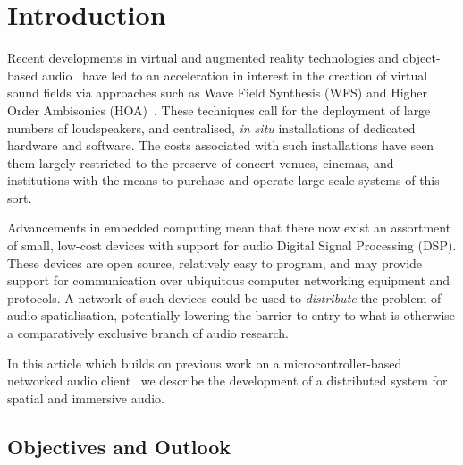 \section{Introduction}\label{sec:introduction}

Recent developments in virtual and augmented reality technologies and
object-based audio~\citep{geier_object-based_2010} have led to an acceleration
in interest in the creation of virtual sound fields via approaches such as Wave
Field Synthesis (WFS) and Higher Order Ambisonics
(HOA)~\citep{berkhout_acoustic_1993,ahrens_theory_2008,daniel_further_2003,
    frank_producing_2015}.
These techniques call for the deployment of large numbers of loudspeakers, and
centralised, \textit{in situ} installations of dedicated hardware and software.
The costs associated with such installations have seen them largely restricted
to the preserve of concert venues, cinemas, and institutions with the means to
purchase and operate large-scale systems of this sort.

Advancements in embedded computing mean that there now exist an assortment of
small, low-cost devices with support for audio Digital Signal Processing (DSP).
These devices are open source, relatively easy to program, and may provide
support for communication over ubiquitous computer networking equipment and
protocols.
A network of such devices could be used to \textit{distribute} the problem of
audio spatialisation, potentially lowering the barrier to entry to what is
otherwise a comparatively exclusive branch of audio research.

In this article \textemdash{} which builds on previous work on a
microcontroller-based networked audio
client~\citep{rushton_microcontroller-based_2023} \textemdash{} we describe the
development of a distributed system for spatial and immersive audio.






\subsection{Objectives and Outlook}\label{subsec:objectives}


